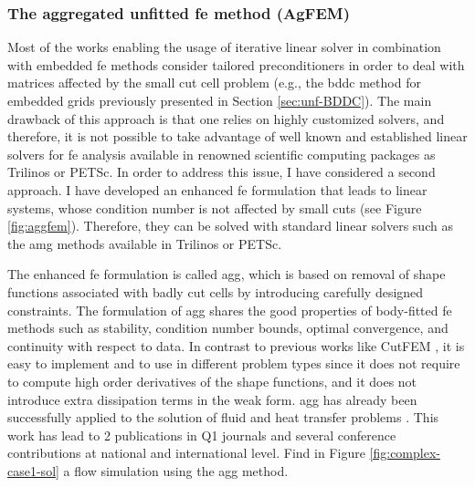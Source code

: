 \documentclass{article}
\newcommand{\bemph}[1]{#1}
\begin{document}
\subsubsection{The aggregated unfitted \ac{fe} method (AgFEM)}

Most of the works enabling the usage of iterative linear solver in combination with embedded \ac{fe} methods consider tailored preconditioners in order to deal with matrices affected by the small cut cell problem (e.g., the \ac{bddc} method for embedded grids previously presented in Section \ref{sec:unf-BDDC}). The main drawback of this approach is that one relies on highly customized solvers, and therefore, it is not possible to take advantage of well known and established linear solvers for \ac{fe} analysis available in renowned scientific computing packages as Trilinos or PETSc. In order to address this issue, I have considered a second approach. \bemph{I have developed an enhanced \ac{fe} formulation that leads to linear systems, whose condition number is not affected by small cuts} (see Figure \ref{fig:aggfem}). Therefore, they can be solved with standard linear solvers such as the \ac{amg} methods available in Trilinos or PETSc.

The enhanced \ac{fe} formulation is called \ac{agg}, which is based on removal of shape functions associated with badly cut cells by introducing carefully designed constraints.  The formulation of \ac{agg} shares the good properties of body-fitted \ac{fe} methods such as stability, condition number bounds, optimal convergence, and continuity with respect to data.  In contrast to previous works like CutFEM \cite{burman_cutfem:_2015}, it is easy to implement and to use in different problem types since it does not require to compute high order derivatives of the shape functions, and it does not introduce extra dissipation terms in the weak form.  \ac{agg} has already been successfully applied to the solution of fluid \cite{Badia2018a} and heat transfer problems \cite{Badia2018}. This work has lead to {{2 publications in Q1 journals}} and several conference contributions at national and international level. Find in Figure \ref{fig:complex-case1-sol} a flow simulation using the \ac{agg} method.
\end{document}
